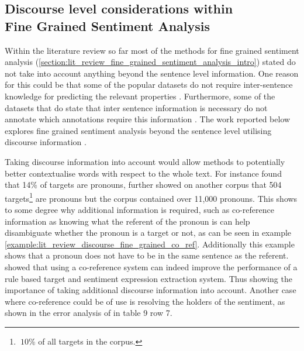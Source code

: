 \subsection[Discourse Level Considerations within Fine Grained Sentiment Analysis]{Discourse level considerations within\\Fine Grained Sentiment Analysis}
\label{section:review_discourse}
Within the literature review so far most of the methods for fine grained sentiment analysis (\ref{section:lit_review_fine_grained_sentiment_analysis_intro}) stated do not take into account anything beyond the sentence level information. One reason for this could be that some of the popular datasets do not require inter-sentence knowledge for predicting the relevant properties \citep{pontiki-etal-2014-semeval, ovrelid2019fine}. Furthermore, some of the datasets that do state that inter sentence information is necessary do not annotate which annotations require this information \citep{pontiki-etal-2015-semeval, pontiki-etal-2016-semeval}. The work reported below explores fine grained sentiment analysis beyond the sentence level utilising discourse information \citep{webber-etal-2003-anaphora}.

Taking discourse information into account would allow methods to potentially better contextualise words with respect to the whole text. For instance \citet{kessler2009targeting} found that 14\% of targets are pronouns, \citet{jakob-gurevych-2010-using} further showed on another corpus \citep{zhuang2006movie} that 504 targets\footnote{$~10\%$ of all targets in the corpus.} are pronouns but the corpus contained over 11,000 pronouns. This shows to some degree why additional information is required, such as co-reference information as knowing what the referent of the pronoun is can help disambiguate whether the pronoun is a target or not, as can be seen in example \ref{example:lit_review_discourse_fine_grained_co_ref}. Additionally this example shows that a pronoun does not have to be in the same sentence as the referent. \citet{jakob-gurevych-2010-using} showed that using a co-reference system can indeed improve the performance of a rule based target and sentiment expression extraction system. Thus showing the importance of taking additional discourse information into account. Another case where co-reference could be of use is resolving the holders of the sentiment, as shown in the error analysis of \citet{marasovic-frank-2018-srl4orl} in table 9 row 7.

